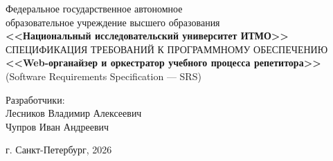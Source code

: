 
\begin{titlepage}
    \centering
    Федеральное государственное автономное \\
    образовательное учреждение высшего образования \\
    \textbf{<<Национальный исследовательский университет ИТМО>>} \\

    \vfill
    СПЕЦИФИКАЦИЯ ТРЕБОВАНИЙ К ПРОГРАММНОМУ ОБЕСПЕЧЕНИЮ \\
    \vspace{0.5\baselineskip}
    \textbf{<<Web-органайзер и оркестратор учебного
        процесса репетитора>>} \\
    \vspace{0.5\baselineskip}
    (Software Requirements Specification — SRS) \\
    \vfill

    \flushright
    Разработчики:\\
    Лесников Владимир Алексеевич \\
    Чупров Иван Андреевич \\

    \vspace{3\baselineskip}

    \centering
    г. Санкт-Петербург, 2026

\end{titlepage}
